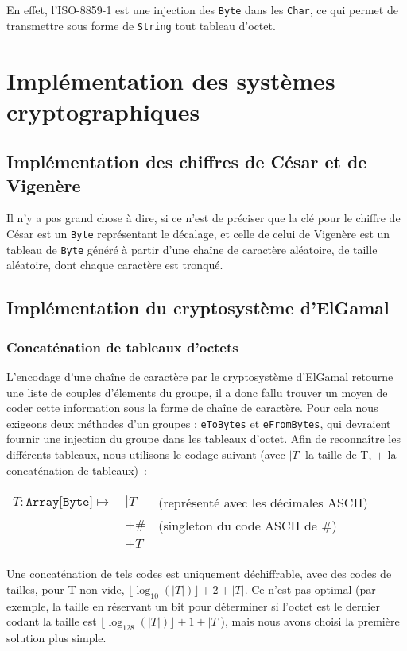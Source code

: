 \documentclass[11pt]{article} %
\begin{document}
En effet, l'ISO-8859-1 est une injection des \texttt{Byte} dans les \texttt{Char}, ce qui permet de transmettre sous forme de \texttt{String} tout tableau d'octet.

\section{Implémentation des systèmes cryptographiques}

\subsection{Implémentation des chiffres de César et de Vigenère}

Il n'y a pas grand chose à dire, si ce n'est de préciser que la clé pour le chiffre de César est un \texttt{Byte} représentant le décalage, et celle de celui de Vigenère est un tableau de \texttt{Byte} généré à partir d'une chaîne de caractère aléatoire, de taille aléatoire, dont chaque caractère est tronqué.

\subsection{Implémentation du cryptosystème d'ElGamal}

\subsubsection{Concaténation de tableaux d'octets}

L'encodage d'une chaîne de caractère par le cryptosystème d'ElGamal retourne une liste de couples d'élements du groupe, il a donc fallu trouver un moyen de coder cette information sous la forme de chaîne de caractère.
Pour cela nous exigeons deux méthodes d'un groupes : \texttt{eToBytes} et \texttt{eFromBytes}, qui devraient fournir une injection du groupe dans les tableaux d'octet. Afin de reconnaître les différents tableaux, nous utilisons le codage suivant (avec $|T|$ la taille de T, $+$ la concaténation de tableaux)~:\\
\begin{tabular}{rll}
  $T:\texttt{Array[Byte]} \mapsto$ & $|T|$ & (représenté avec les décimales ASCII) \\
  & $+  \#$ & (singleton du code ASCII de \#)\\
  & $+ T$ & \\
\end{tabular}

Une concaténation de tels codes est uniquement déchiffrable, avec des codes de tailles, pour T non vide, $\lfloor\log_{10}(|T|)\rfloor + 2 + |T|$. Ce n'est pas optimal (par exemple, la taille en réservant un bit pour déterminer si l'octet est le dernier codant la taille est $\lfloor\log_{128}(|T|)\rfloor + 1 + |T|$), mais nous avons choisi la première solution plus simple.
\end{document}
